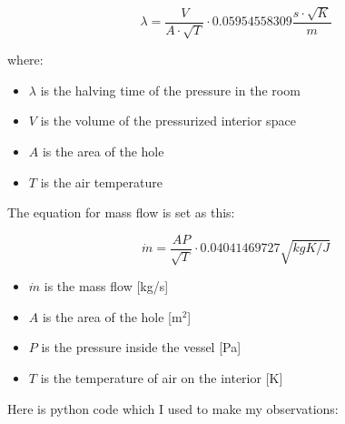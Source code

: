 \documentclass[a4paper]{article}
\begin{document}
	$$ \lambda = \frac{V}{A \cdot \sqrt{T}} \cdot 0.05954558309\frac{s \cdot \sqrt{K}}{m} $$
	    
	where:
	    
	\begin{itemize}
		\item $\lambda$ is the halving time of the pressure in the room
	    
	    \item $V$ is the volume of the pressurized interior space
	    
	    \item $A$ is the area of the hole
	            
	    \item $T$ is the air temperature
	\end{itemize}
	
	\pagebreak
	
	The equation for mass flow is set as this:
	
	$$ \dot{m} = \frac{AP}{\sqrt{T}} \cdot 0.04041469727\sqrt{kgK/J} $$
	
	\begin{itemize}
		\item $\dot{m}$ is the mass flow [kg/s]
		
		\item $A$ is the area of the hole [m$^2$]
		
		\item $P$ is the pressure inside the vessel [Pa]
		
		\item $T$ is the temperature of air on the interior [K]
	\end{itemize}
	
    \bigskip
    
	Here is python code which I used to make my observations:
	
\end{document}
